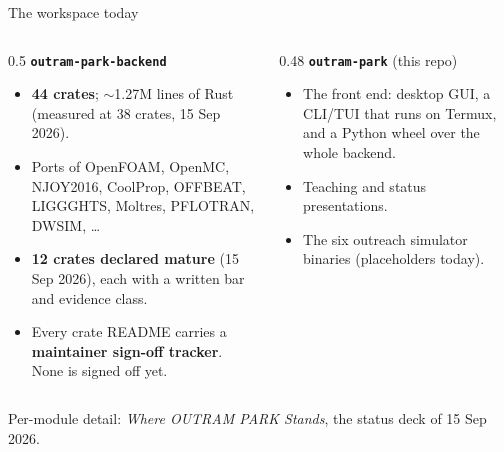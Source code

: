 \documentclass[aspectratio=169]{beamer}
\begin{document}
\begin{frame}{The workspace today}
    \begin{columns}[T]
        \begin{column}{0.5\textwidth}
            \textbf{\texttt{outram-park-backend}}
            \begin{itemize}
                \footnotesize
                \item \textbf{44 crates}; $\sim$1.27M lines of Rust
                      (measured at 38 crates, 15 Sep 2026).
                \item Ports of OpenFOAM, OpenMC, NJOY2016, CoolProp,
                      OFFBEAT, LIGGGHTS, Moltres, PFLOTRAN, DWSIM, \dots
                \item \textbf{12 crates declared mature} (15 Sep 2026),
                      each with a written bar and evidence class.
                \item Every crate README carries a \textbf{maintainer
                      sign-off tracker}. None is signed off yet.
            \end{itemize}
        \end{column}
        \begin{column}{0.48\textwidth}
            \textbf{\texttt{outram-park}} (this repo)
            \begin{itemize}
                \footnotesize
                \item The front end: desktop GUI, a CLI/TUI that runs on
                      Termux, and a Python wheel over the whole backend.
                \item Teaching and status presentations.
                \item The six outreach simulator binaries (placeholders
                      today).
            \end{itemize}
        \end{column}
    \end{columns}

    \medskip
    \footnotesize
    Per-module detail: \emph{Where OUTRAM PARK Stands}, the status deck of
    15 Sep 2026.
\end{frame}
\end{document}
